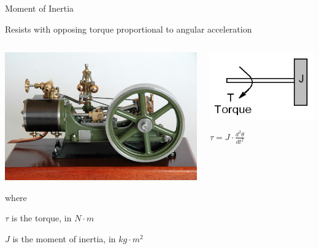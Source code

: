 \documentclass[compress]{beamer}
\begin{document}
\begin{frame}{Moment of Inertia}

    Resists with opposing torque proportional to angular acceleration

    \begin{columns}
        \begin{column}{0.5\linewidth}
            \begin{center}
                \includegraphics[height=0.4\paperheight]{image62}
            \end{center}

            where

            $\tau$ is the torque, in $N\cdot m$

            $J$ is the moment of inertia, in $kg \cdot m^2$

        \end{column}
        \begin{column}{0.5\linewidth}
            \begin{center}
                \includegraphics[width=0.8\linewidth]{torque}

            \Huge
            $\displaystyle\tau = J \cdot \frac{d^2 \theta}{dt^2}$
            \end{center}
        \end{column}
    \end{columns}

\end{frame}
\end{document}
